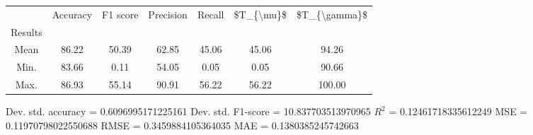 \begin{tabular}{|c|c|c|c|c|c|c|}
\toprule
{} &  Accuracy &  F1 score &  Precision &  Recall &  \$T\_\{\textbackslash mu\}\$ &  \$T\_\{\textbackslash gamma\}\$ \\
Results &           &           &            &         &            &               \\
\hline
Mean    &     86.22 &     50.39 &      62.85 &   45.06 &      45.06 &         94.26 \\
Min.    &     83.66 &      0.11 &      54.05 &    0.05 &       0.05 &         90.66 \\
Max.    &     86.93 &     55.14 &      90.91 &   56.22 &      56.22 &        100.00 \\
\bottomrule
\end{tabular}

 Dev. std. accuracy = 0.6096995171225161
 Dev. std. F1-score = 10.837703513970965
 $R^2$ = 0.12461718335612249
 MSE = 0.11970798022550688
 RMSE = 0.3459884105364035
 MAE = 0.1380385245742663